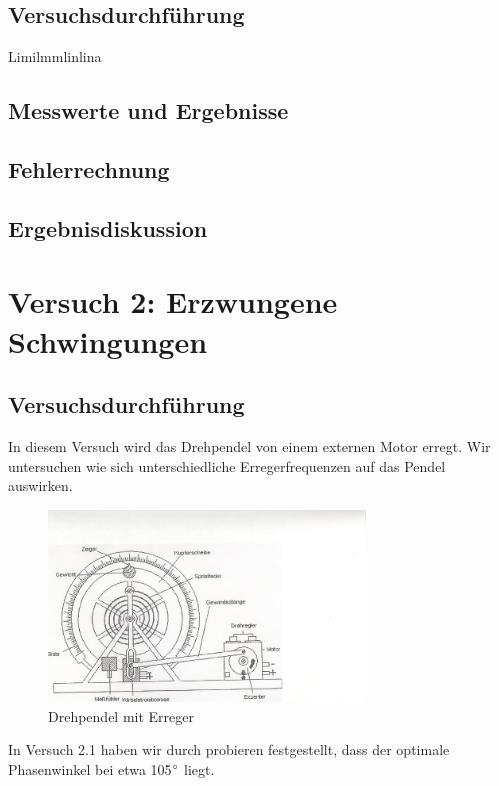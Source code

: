 \documentclass{scrartcl}
\begin{document}
\subsection{Versuchsdurchführung}
Limilmmlinlina
\subsection{Messwerte und Ergebnisse}

\subsection{Fehlerrechnung}

\subsection{Ergebnisdiskussion}


\section{Versuch 2: Erzwungene Schwingungen}
\subsection{Versuchsdurchführung}
In diesem Versuch wird das Drehpendel von einem externen Motor erregt. Wir untersuchen
wie sich unterschiedliche Erregerfrequenzen auf das Pendel auswirken.

\begin{figure}[h]
  \caption{Drehpendel mit Erreger}
  \centering
    \includegraphics[width=0.75\textwidth]{800px-Pohlsches_Rad}
\end{figure}

In Versuch 2.1 haben wir durch probieren festgestellt, dass der optimale Phasenwinkel bei etwa 105$\degree$ liegt. 
\end{document}
